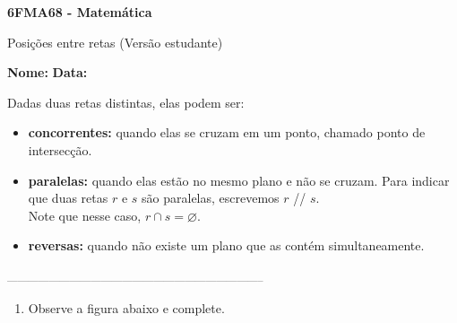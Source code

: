 \documentclass[a4paper,14pt]{article}
\begin{document}
	
	\noindent\textbf{6FMA68 - Matemática} 
	
	\begin{center}Posições entre retas (Versão estudante)
	\end{center}
	
	\noindent\textbf{Nome:} \underline{\hspace{10cm}}
	\noindent\textbf{Data:} \underline{\hspace{4cm}}
	
	\begin{multicols}{2}
		\noindent Dadas duas retas distintas, elas podem ser:
		\begin{itemize}
			\item \textbf{concorrentes:} quando elas se cruzam em um ponto, chamado ponto de intersecção.
			\item \textbf{paralelas:} quando elas estão no mesmo plano e não se cruzam. Para indicar que duas retas $r$ e $s$ são paralelas, escrevemos $r$ // $s$. \\
			Note que nesse caso, $r \cap s = \varnothing$.
			\item \textbf{reversas:} quando não existe um plano que as contém simultaneamente.
		\end{itemize}
    	\noindent\textsubscript{--------------------------------------------------------------------------}
    	\begin{enumerate}
   			\item Observe a figura abaixo e complete.
   			\begin{center}
   			\end{center}

\end{enumerate}
\end{multicols}
\end{document}
